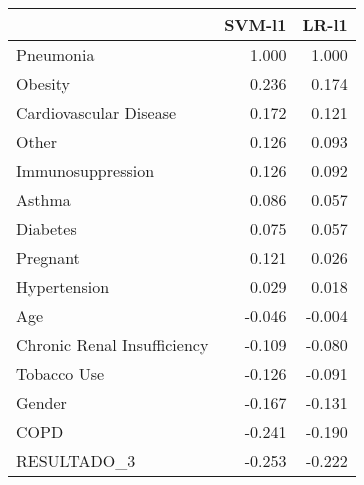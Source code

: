 \begin{tabular}{lrr}
\toprule
{} &  SVM-l1 &  LR-l1 \\
\midrule
Pneumonia                   &   1.000 &  1.000 \\
Obesity                     &   0.236 &  0.174 \\
Cardiovascular Disease      &   0.172 &  0.121 \\
Other                       &   0.126 &  0.093 \\
Immunosuppression           &   0.126 &  0.092 \\
Asthma                      &   0.086 &  0.057 \\
Diabetes                    &   0.075 &  0.057 \\
Pregnant                    &   0.121 &  0.026 \\
Hypertension                &   0.029 &  0.018 \\
Age                         &  -0.046 & -0.004 \\
Chronic Renal Insufficiency &  -0.109 & -0.080 \\
Tobacco Use                 &  -0.126 & -0.091 \\
Gender                      &  -0.167 & -0.131 \\
COPD                        &  -0.241 & -0.190 \\
RESULTADO\_3                 &  -0.253 & -0.222 \\
\bottomrule
\end{tabular}
